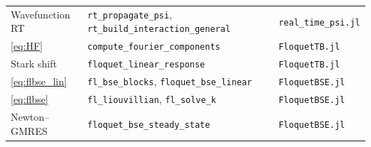 \documentclass[11pt,a4paper]{article}
\newcommand{\code}[1]{\texttt{#1}}
\begin{document}
\begin{center}
\begin{tabular}{@{}lll@{}}
Wavefunction RT & \code{rt\_propagate\_psi}, \code{rt\_build\_interaction\_general} & \code{real\_time\_psi.jl} \\
\eqref{eq:HF} & \code{compute\_fourier\_components} & \code{FloquetTB.jl} \\
Stark shift & \code{floquet\_linear\_response} & \code{FloquetTB.jl} \\
\eqref{eq:flbse_lin} & \code{fl\_bse\_blocks}, \code{floquet\_bse\_linear} & \code{FloquetBSE.jl} \\
\eqref{eq:flbse} & \code{fl\_liouvillian}, \code{fl\_solve\_k} & \code{FloquetBSE.jl} \\
Newton--GMRES & \code{floquet\_bse\_steady\_state} & \code{FloquetBSE.jl} \\
\bottomrule
\end{tabular}
\end{center}
\end{document}

